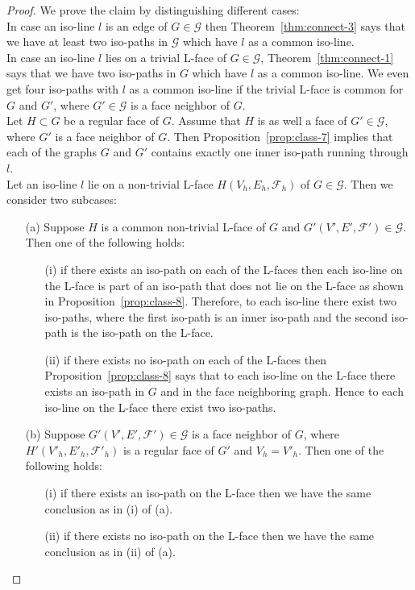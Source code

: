 \documentclass[a4paper,11pt]{article}
\begin{document}
\begin{proof} We prove the claim by distinguishing different cases:\\

 In case an iso-line $l$ is an edge of $G\in \mathcal{G}$ then
Theorem~\ref{thm:connect-3} says that we have at least two iso-paths in $\mathcal{G}$ which have $l$
as a common iso-line.\\

 In case an iso-line $l$ lies on a trivial L-face of $G\in \mathcal{G}$,
Theorem~\ref{thm:connect-1} says that we have two iso-paths in $G$ which have $l$ as a common iso-line.
We even get four iso-paths with $l$ as a common iso-line if the trivial L-face is common for $G$ and
$G'$, where $G'\in \mathcal{G}$ is a face neighbor of $G$.\\

 Let $H\subset G$ be a regular face of $G$. Assume that $H$ is as well a face
of $G'\in \mathcal{G}$, where $G'$ is a face neighbor of $G$. Then Proposition~\ref{prop:class-7}
implies that each of the graphs $G$ and $G'$ contains exactly one inner iso-path running through $l$.\\

 Let an iso-line $l$ lie on a non-trivial L-face $H(V_h,E_h,\mathcal{F}_h)$ of
$G\in \mathcal{G}$. Then we consider two subcases:
\begin{itemize}
\item[(a)] Suppose $H$ is a common non-trivial L-face of $G$ and $G'(V',E',\mathcal{F}')\in\mathcal{G}$. Then
one of the following holds:
\begin{itemize}
\item[(i)] if there exists an iso-path on each of the L-faces then each iso-line on the L-face is part of an
iso-path that does not lie on the L-face as shown in Proposition~\ref{prop:class-8}. Therefore, to each iso-line
there exist two iso-paths, where the first iso-path is an inner iso-path and the second iso-path is the
iso-path on the L-face.
\item[(ii)] if there exists no iso-path on each of the L-faces then Proposition~\ref{prop:class-8} says that
to each iso-line on the L-face there exists an iso-path in $G$ and in the face neighboring graph. Hence to
each iso-line on the L-face there exist two iso-paths.
\end{itemize}
\item[(b)] Suppose $G'(V',E',\mathcal{F}')\in \mathcal{G}$ is a face neighbor of $G$, where
$H'(V'_h,E'_h,\mathcal{F}'_h)$ is a regular face of $G'$ and $V_h=V'_h$. Then one of the following
holds:
\begin{itemize}
\item[(i)] if there exists an iso-path on the L-face then we have the same conclusion as in (i) of (a).
\item[(ii)] if there exists no iso-path on the L-face then we have the same conclusion as in (ii) of (a).
\end{itemize}
\end{itemize}
\vspace{-0.7cm}
\end{proof}
\end{document}
